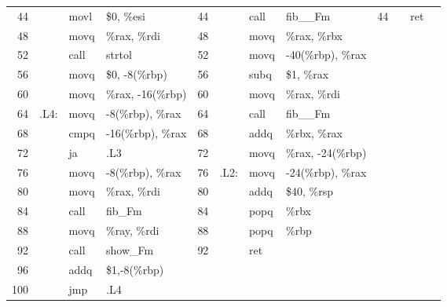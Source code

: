\documentclass{ti2}
\begin{document}
\begin{minipage}{\linewidth}
{\begin{tabular}{|r|rll||r|rll||r|rll|}
		44 &       & movl  & \$0, \%esi                      & 44 &            & call  & fib\_\_Fm         & 44 &             & ret   &  \\
		48 &       & movq  & \%rax, \%rdi                    & 48 &            & movq  & \%rax, \%rbx      &    &             &       &  \\
		52 &       & call  & strtol                          & 52 &            & movq  & -40(\%rbp), \%rax &    &             &       &  \\
		56 &       & movq  & \$0, -8(\%rbp)                  & 56 &            & subq  & \$1, \%rax        &    &             &       &  \\
		60 &       & movq  & \%rax, -16(\%rbp)               & 60 &            & movq  & \%rax, \%rdi      &    &             &       &  \\
		64 &  .L4: & movq  & -8(\%rbp), \%rax                & 64 &            & call  & fib\_\_Fm         &    &             &       &  \\
		68 &       & cmpq  & -16(\%rbp), \%rax               & 68 &            & addq  & \%rbx, \%rax      &    &             &       &  \\
		72 &       & ja    & .L3                             & 72 &            & movq  & \%rax, -24(\%rbp) &    &             &       &  \\
		76 &       & movq  & -8(\%rbp), \%rax                & 76 &       .L2: & movq  & -24(\%rbp), \%rax &    &             &       &  \\
		80 &       & movq  & \%rax, \%rdi                    & 80 &            & addq  & \$40, \%rsp       &    &             &       &  \\
		84 &       & call  & fib\_Fm                         & 84 &            & popq  & \%rbx             &    &             &       &  \\
		88 &       & movq  & \%ray, \%rdi                    & 88 &            & popq  & \%rbp             &    &             &       &  \\
		92 &       & call  & show\_Fm                        & 92 &            & ret   &                   &    &             &       &  \\
		96 &       & addq  & \$1,-8(\%rbp)                   &    &            &       &                   &    &             &       &  \\
		100 &       & jmp   & .L4                             &    &            &       &                   &    &             &       &  \\

\end{tabular}}
\end{minipage}
\end{document}
